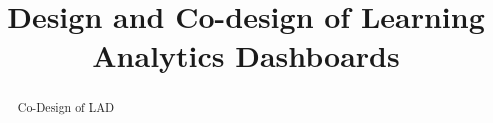 \documentclass[manuscript,screen,nonacm,12pt]{acmart}
\begin{document}
\title{Design and Co-design of Learning Analytics Dashboards}



\renewcommand{\shortauthors}{Author, et al.}

\begin{abstract}
  Co-Design of LAD
\end{abstract}



\maketitle
\end{document}

